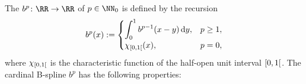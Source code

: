%
%
%
The 
$b^p\colon \RR \to \RR$ of  $p \in \NN_0$
is defined by the recursion
\begin{equation}
  \label{eq:cardinalBSpline}
  b^p(x)
  :=
  \begin{cases}
    \displaystyle\int_0^1 b^{p-1}(x - y) \mathop{}\!\mathrm{d}{}y,&p \ge 1,\\
    \chi_{\mathopen[0, 1\mathclose[}(x),&p = 0,
  \end{cases}
\end{equation}
where $\chi_{\mathopen[0, 1\mathclose[}$ is the characteristic function of
the half-open unit interval $\mathopen[0, 1\mathclose[$.
The cardinal B-spline $b^p$ has the following properties:

